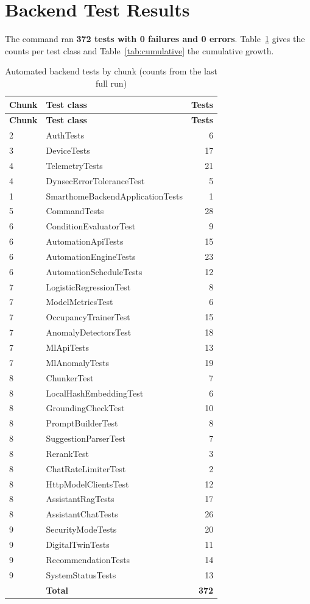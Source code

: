 \documentclass[12pt,a4paper,oneside]{report}
\newcommand{\code}[1]{\texttt{\detokenize{#1}}}
\begin{document}
\section{Backend Test Results}
The command \code{mvnw verify} ran \textbf{372 tests with 0 failures and 0 errors}. Table~\ref{tab:testcounts} gives the counts per test class and Table~\ref{tab:cumulative} the cumulative growth.

\begin{longtable}{@{}p{2.2cm}p{9.0cm}r@{}}
\caption{Automated backend tests by chunk (counts from the last full run)}\label{tab:testcounts}\\
\toprule
\textbf{Chunk} & \textbf{Test class} & \textbf{Tests}\\
\midrule
\endfirsthead
\toprule
\textbf{Chunk} & \textbf{Test class} & \textbf{Tests}\\
\midrule
\endhead
2 & AuthTests & 6\\
3 & DeviceTests & 17\\
4 & TelemetryTests & 21\\
4 & DynsecErrorToleranceTest & 5\\
1 & SmarthomeBackendApplicationTests & 1\\
5 & CommandTests & 28\\
6 & ConditionEvaluatorTest & 9\\
6 & AutomationApiTests & 15\\
6 & AutomationEngineTests & 23\\
6 & AutomationScheduleTests & 12\\
7 & LogisticRegressionTest & 8\\
7 & ModelMetricsTest & 6\\
7 & OccupancyTrainerTest & 15\\
7 & AnomalyDetectorsTest & 18\\
7 & MlApiTests & 13\\
7 & MlAnomalyTests & 19\\
8 & ChunkerTest & 7\\
8 & LocalHashEmbeddingTest & 6\\
8 & GroundingCheckTest & 10\\
8 & PromptBuilderTest & 8\\
8 & SuggestionParserTest & 7\\
8 & RerankTest & 3\\
8 & ChatRateLimiterTest & 2\\
8 & HttpModelClientsTest & 12\\
8 & AssistantRagTests & 17\\
8 & AssistantChatTests & 26\\
9 & SecurityModeTests & 20\\
9 & DigitalTwinTests & 11\\
9 & RecommendationTests & 14\\
9 & SystemStatusTests & 13\\
\midrule
 & \textbf{Total} & \textbf{372}\\
\bottomrule
\end{longtable}
\end{document}
